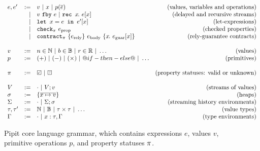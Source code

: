 
\begin{figure}
  \[
  \begin{array}{lrlr}
    e, e' & := & v ~|~ x ~|~ p(\ov{e}) & \mbox{(values, variables and operations)} \\
          & | & \xfby{v}{e} ~|~ \xrec{x}{e[x]} & \mbox{(delayed and recursive streams)} \\ %
          & | & \xlet{x}{e}{e'[x]} & \mbox{(let-expressions)}\\
          & | & \xcheckP{\PStatus}{e_{\text{prop}}} & \mbox{(checked properties)} \\
          & | & \xcontractP{\PStatus}{\erely}{\ebody}{\rawbind{x}{\eguar[x]}} & \mbox{(rely-guarantee contracts)} \\
    \\
    v & := & n \in \mathbb{N} ~|~ b \in \mathbb{B} ~|~ r \in \mathbb{R} ~|~ \hdots  & \mbox{(values)} \\
    p & := & (+) ~|~ (-) ~|~ (\times) ~|~ @if-then-else@ ~|~ \hdots & \mbox{(primitives)} \\
    \\
    \PStatus & := & \PSValid ~|~ \PSUnknown & \mbox{(property statuses: valid or unknown)}\\
    \\
    V & := & \cdot ~|~ V;v & \mbox{(streams of values)} \\
    \sigma & := & \sgl{\ov{x \mapsto v}} & \mbox{(heaps)} \\
    \Sigma & := & \cdot ~|~ \Sigma;\sigma & \mbox{(streaming history environments)} \\
    \tau, \tau' & := & \mathbb{N} ~|~ \mathbb{B} ~|~ \tau \times \tau ~|~ \hdots & \mbox{(value types)} \\
    \Gamma & := & \cdot ~|~ x : \tau, \Gamma & \mbox{(type environments)}  \\
    \end{array}
  \]
  \caption{Pipit core language grammar, which contains expressions $e$, values $v$, primitive operations $p$, and property statuses $\pi$.}
  \label{f:core-grammar}
\end{figure}